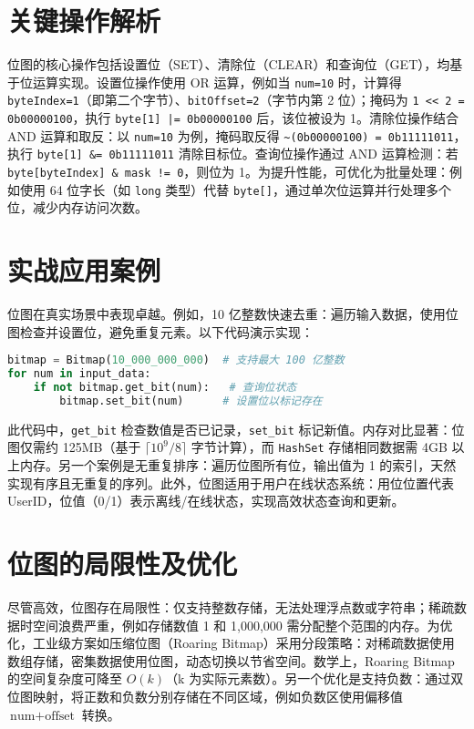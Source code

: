 \chapter{关键操作解析}
位图的核心操作包括设置位（SET）、清除位（CLEAR）和查询位（GET），均基于位运算实现。设置位操作使用 OR 运算，例如当 \texttt{num=10} 时，计算得 \texttt{byteIndex=1}（即第二个字节）、\texttt{bitOffset=2}（字节内第 2 位）；掩码为 \texttt{1 << 2 = 0b00000100}，执行 \texttt{byte[1] |= 0b00000100} 后，该位被设为 1。清除位操作结合 AND 运算和取反：以 \texttt{num=10} 为例，掩码取反得 \texttt{\~{}(0b00000100) = 0b11111011}，执行 \texttt{byte[1] \&{}= 0b11111011} 清除目标位。查询位操作通过 AND 运算检测：若 \texttt{byte[byteIndex] \&{} mask != 0}，则位为 1。为提升性能，可优化为批量处理：例如使用 64 位字长（如 \texttt{long} 类型）代替 \texttt{byte[]}，通过单次位运算并行处理多个位，减少内存访问次数。\par
\chapter{实战应用案例}
位图在真实场景中表现卓越。例如，10 亿整数快速去重：遍历输入数据，使用位图检查并设置位，避免重复元素。以下代码演示实现：\par
\begin{lstlisting}[language=python]
bitmap = Bitmap(10_000_000_000)  # 支持最大 100 亿整数
for num in input_data:
    if not bitmap.get_bit(num):   # 查询位状态
        bitmap.set_bit(num)      # 设置位以标记存在
\end{lstlisting}
此代码中，\texttt{get\_{}bit} 检查数值是否已记录，\texttt{set\_{}bit} 标记新值。内存对比显著：位图仅需约 125MB（基于 $ \lceil 10^9 / 8 \rceil $ 字节计算），而 \texttt{HashSet} 存储相同数据需 4GB 以上内存。另一个案例是无重复排序：遍历位图所有位，输出值为 1 的索引，天然实现有序且无重复的序列。此外，位图适用于用户在线状态系统：用位位置代表 UserID，位值（0/1）表示离线/在线状态，实现高效状态查询和更新。\par
\chapter{位图的局限性及优化}
尽管高效，位图存在局限性：仅支持整数存储，无法处理浮点数或字符串；稀疏数据时空间浪费严重，例如存储数值 1 和 1,000,000 需分配整个范围的内存。为优化，工业级方案如压缩位图（Roaring Bitmap）采用分段策略：对稀疏数据使用数组存储，密集数据使用位图，动态切换以节省空间。数学上，Roaring Bitmap 的空间复杂度可降至 $ O(k) $（k 为实际元素数）。另一个优化是支持负数：通过双位图映射，将正数和负数分别存储在不同区域，例如负数区使用偏移值 $ \text{num} + \text{offset} $ 转换。\par
